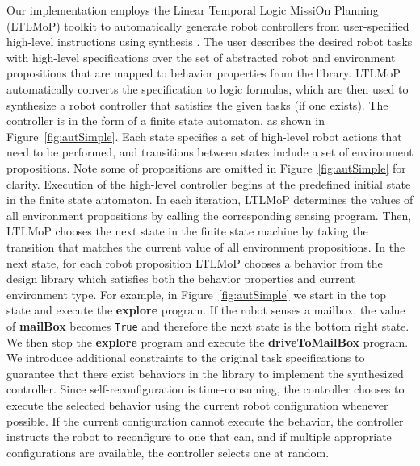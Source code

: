 \documentclass[12pt]{article}
\newcommand{\lt}{{\tt True}}
\begin{document}
Our implementation employs the Linear Temporal Logic MissiOn Planning (LTLMoP) toolkit to automatically generate robot controllers from user-specified high-level instructions using synthesis \cite{DBLP:conf/iros/FinucaneJK10,DBLP:journals/trob/Kress-GazitFP09}.
The user describes the desired robot tasks with high-level specifications over the set of abstracted robot and environment propositions that are mapped to behavior properties from the library.
LTLMoP automatically converts the specification to logic formulas, which are then used to synthesize a robot controller that satisfies the given tasks (if one exists).
The controller is in the form of a finite state automaton, as shown in Figure~\ref{fig:autSimple}.
Each state specifies a set of high-level robot actions that need to be performed, and transitions between states include a set of environment propositions.
Note some of propositions are omitted in Figure~\ref{fig:autSimple} for clarity.
Execution of the high-level controller begins at the predefined initial state in the finite state automaton. In each iteration, LTLMoP determines the values of all environment propositions by calling the corresponding sensing program. Then, LTLMoP chooses the next state in the finite state machine by taking the transition that matches the current value of all environment propositions. 
In the next state, for each robot proposition LTLMoP chooses a behavior from the design library which satisfies both the behavior properties and current environment type.
For example, in Figure~\ref{fig:autSimple} we start in the top state and execute the \textbf{explore} program.
If  the robot senses a mailbox, the value of \textbf{mailBox} becomes \lt{} and therefore the next state is the bottom right state. We then stop the \textbf{explore} program and execute the \textbf{driveToMailBox} program.
We introduce additional constraints to the original task specifications to guarantee that there exist behaviors in the library to implement the synthesized controller.
Since self-reconfiguration is time-consuming, the controller chooses to execute the selected behavior using the current robot configuration whenever possible.
If the current configuration cannot execute the behavior, the controller instructs the robot to reconfigure to one that can, and if multiple appropriate configurations are available, the controller selects one at random.

\end{document}
